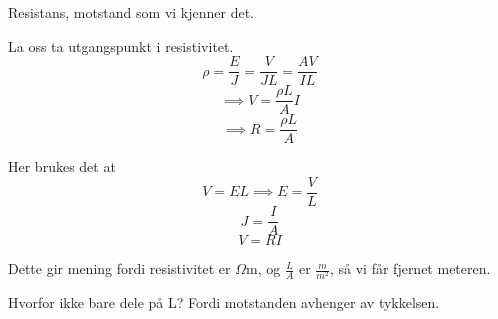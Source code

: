 Resistans, motstand som vi kjenner det.

La oss ta utgangspunkt i resistivitet.
$$\rho = \frac{E}{J}
       = \frac{V}{J L}
       = \frac{A V}{I L}$$
$$\implies
  V = \frac{\rho L}{A} I$$
$$\implies
  R = \frac{\rho L}{A}$$

Her brukes det at
$$V = E L \implies E = \frac{V}{L}$$
$$J = \frac{I}{A}$$
$$V = R I$$

Dette gir mening fordi resistivitet er $\Omega$m,
og $\frac{L}{A}$ er $\frac{m}{m^2}$, så vi får fjernet meteren.

Hvorfor ikke bare dele på L? Fordi motstanden avhenger av tykkelsen.
